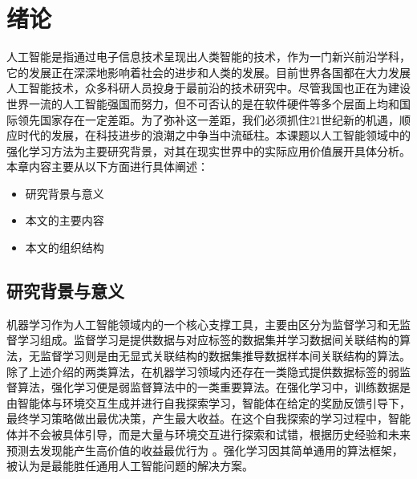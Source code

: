 
\chapter{绪论}\label{chap:intro}

人工智能是指通过电子信息技术呈现出人类智能的技术，作为一门新兴前沿学科，它的发展正在深深地影响着社会的进步和人类的发展。目前世界各国都在大力发展人工智能技术，众多科研人员投身于最前沿的技术研究中。尽管我国也正在为建设世界一流的人工智能强国而努力，但不可否认的是在软件硬件等多个层面上均和国际领先国家存在一定差距。为了弥补这一差距，我们必须抓住21世纪新的机遇，顺应时代的发展，在科技进步的浪潮之中争当中流砥柱。本课题以人工智能领域中的强化学习方法为主要研究背景，对其在现实世界中的实际应用价值展开具体分析。本章内容主要从以下方面进行具体阐述：

\begin{itemize}
    \item 研究背景与意义
    \item 本文的主要内容
    \item 本文的组织结构
\end{itemize}

\section{研究背景与意义}

机器学习作为人工智能领域内的一个核心支撑工具，主要由区分为监督学习和无监督学习组成\cite{goodfellow2016deep}。监督学习是提供数据与对应标签的数据集并学习数据间关联结构的算法，无监督学习则是由无显式关联结构的数据集推导数据样本间关联结构的算法\cite{bishop2006pattern,2012statsmethods}。除了上述介绍的两类算法，在机器学习领域内还存在一类隐式提供数据标签的弱监督算法，强化学习便是弱监督算法中的一类重要算法。在强化学习中，训练数据是由智能体与环境交互生成并进行自我探索学习，智能体在给定的奖励反馈引导下，最终学习策略做出最优决策，产生最大收益\cite{tan1993multi}。在这个自我探索的学习过程中，智能体并不会被具体引导，而是大量与环境交互进行探索和试错，根据历史经验和未来预测去发现能产生高价值的收益最优行为 \cite{kaelbling1996reinforcement,sutton2018reinforcement}。强化学习因其简单通用的算法框架，被认为是最能胜任通用人工智能问题的解决方案\cite{shoham2003multi}。 


    
